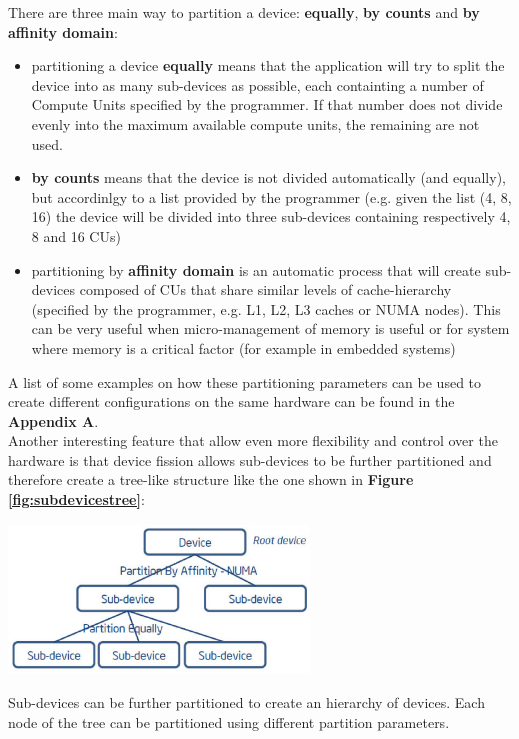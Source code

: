 There are three main way to partition a device: \textbf{equally}, \textbf{by counts} and \textbf{by affinity domain}:

\begin{itemize}
	\item partitioning a device \textbf{equally} means that the application will try to split the device into as many sub-devices as possible, each containting a number of Compute Units specified by the programmer. If that number does not divide evenly into the maximum available compute units, the remaining are not used.
	\item \textbf{by counts} means that the device is not divided automatically (and equally), but accordinlgy to a list provided by the programmer (e.g. given the list (4, 8, 16) the device will be divided into three sub-devices containing respectively 4, 8 and 16 CUs)
	\item partitioning by \textbf{affinity domain} is an automatic process that will create sub-devices composed of CUs that share similar levels of cache-hierarchy (specified by the programmer, e.g. L1, L2, L3 caches or NUMA nodes). This can be very useful when micro-management of memory is useful or for system where memory is a critical factor (for example in  embedded systems)
\end{itemize}

A list of some examples on how these partitioning parameters can be used to create different configurations on the same hardware can be found in the \textbf{Appendix A}.\\
Another interesting feature that allow even more flexibility and control over the hardware is that device fission allows sub-devices to be further partitioned and therefore create a tree-like structure like the one shown in \textbf{Figure \ref{fig:subdevicestree}}:

\begin{figurehere}
 \centering
 \includegraphics[width=8cm, height=4cm]{./eps/partitionTree.eps}
 \caption{Sub-devices can be further partitioned to create an hierarchy of devices. Each node of the tree can be partitioned using different partition parameters.}
 \label{fig:subdevicestree}
\end{figurehere}

